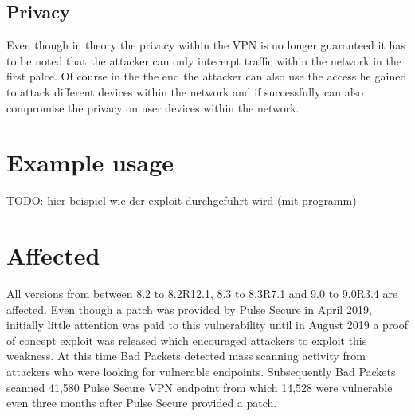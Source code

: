 \subsection{Privacy}
Even though in theory the privacy within the VPN is no longer guaranteed it has to be noted that the attacker can only intecerpt traffic within the network in the first palce. Of course in the the end the attacker can also use the access he gained to attack different devices within the network and if successfully can also compromise the privacy on user devices within the network. 

\section{Example usage}
\label{example}
TODO: hier beispiel wie der exploit durchgeführt wird (mit programm)

\section{Affected}
\label{affected}
All versions from between 8.2 to 8.2R12.1, 8.3 to 8.3R7.1 and 9.0 to 9.0R3.4 are affected. \autocite{NVDCVE:online}
Even though a patch was provided by Pulse Secure in April 2019, initially little attention was paid to this vulnerability until in August 2019 a proof of concept exploit was released which encouraged attackers to exploit this weakness. \autocite{Tenable1:online} At this time Bad Packets detected mass scanning activity from attackers who were looking for vulnerable endpoints. Subsequently Bad Packets scanned 41,580 Pulse Secure VPN endpoint from which 14,528 were vulnerable even three months after Pulse Secure provided a patch. \autocite{BadPackets:online}

